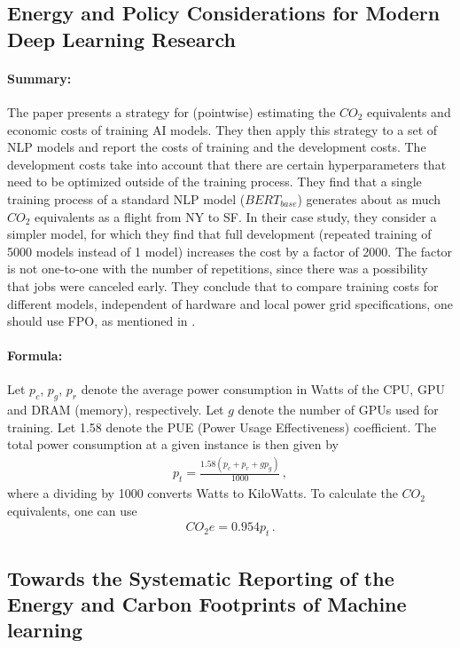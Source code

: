 \documentclass[a4paper, 12pt]{article}
\begin{document}
\subsection{Energy and Policy Considerations for Modern Deep Learning Research}
\label{seq:Strubell_2020}
\centerline{}
\vspace{1em}

\paragraph{Summary:} The paper presents a strategy for (pointwise) estimating the
$CO_2$ equivalents and economic costs of training AI models. They then apply this
strategy to a set of NLP models and report the costs of training and the development
costs. The development costs take into account that there are certain hyperparameters
that need to be optimized outside of the training process. They find that a single
training process of a standard NLP model ($BERT_{base}$) generates about as much $CO_2$
equivalents as a flight from NY to SF. In their case study, they consider a simpler
model, for which they find that full development (repeated training of 5000 models
instead of 1 model) increases the cost by a factor of 2000. The factor is not one-to-one
with the number of repetitions, since there was a possibility that jobs were canceled
early. They conclude that to compare training costs for different models, independent of
hardware and local power grid specifications, one should use FPO, as mentioned in
.

\paragraph{Formula:} Let $p_c$, $p_g$, $p_r$ denote the average power consumption in
Watts of the CPU, GPU and DRAM (memory), respectively. Let $g$ denote the number of GPUs
used for training. Let 1.58 denote the PUE (Power Usage Effectiveness) coefficient. The
total power consumption at a given instance is then given by
\begin{align}
    p_t = \frac{1.58 (p_c + p_r + g p_g)}{1000} \,,
\end{align}
where a dividing by 1000 converts Watts to KiloWatts. To calculate the $CO_2$
equivalents, one can use
\begin{align}
    CO_2e = 0.954 p_t \,.
\end{align}


\subsection{Towards the Systematic Reporting of the Energy and Carbon Footprints of
Machine learning}
\label{seq:Henderson_2020}
\centerline{}
\vspace{1em}
\end{document}
